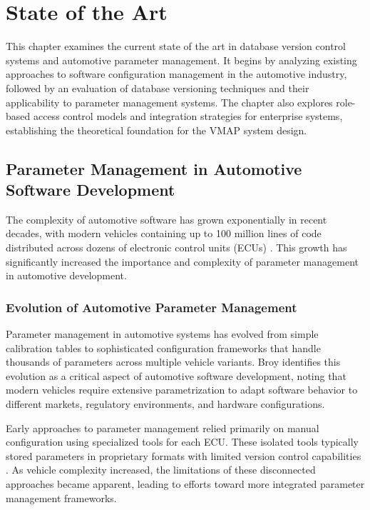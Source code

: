 \chapter{State of the Art}
\label{chap:state-of-art}

This chapter examines the current state of the art in database version control systems and automotive parameter management. It begins by analyzing existing approaches to software configuration management in the automotive industry, followed by an evaluation of database versioning techniques and their applicability to parameter management systems. The chapter also explores role-based access control models and integration strategies for enterprise systems, establishing the theoretical foundation for the VMAP system design.

\section{Parameter Management in Automotive Software Development}
\label{sec:parameter-management}

The complexity of automotive software has grown exponentially in recent decades, with modern vehicles containing up to 100 million lines of code distributed across dozens of electronic control units (ECUs) \cite{pretschner2007software}. This growth has significantly increased the importance and complexity of parameter management in automotive development.

\subsection{Evolution of Automotive Parameter Management}
\label{subsec:evolution-parameter-management}

Parameter management in automotive systems has evolved from simple calibration tables to sophisticated configuration frameworks that handle thousands of parameters across multiple vehicle variants. Broy \cite{broy2006challenges} identifies this evolution as a critical aspect of automotive software development, noting that modern vehicles require extensive parametrization to adapt software behavior to different markets, regulatory environments, and hardware configurations.

Early approaches to parameter management relied primarily on manual configuration using specialized tools for each ECU. These isolated tools typically stored parameters in proprietary formats with limited version control capabilities \cite{staron2021automotive}. As vehicle complexity increased, the limitations of these disconnected approaches became apparent, leading to efforts toward more integrated parameter management frameworks.

